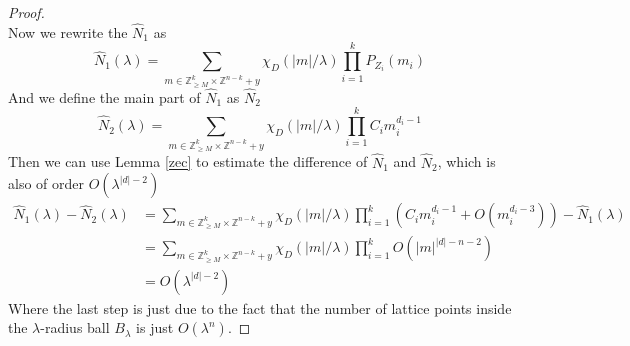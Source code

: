 \documentclass[10pt]{amsart}
\newcommand{\1}{\mathbb{1}}
\newcommand{\Z}{{\mathbb Z}}
\begin{document}
\begin{proof}
\[    \]
    Now we rewrite the $\hat{N}_1$ as
    \[
    \hat{N}_1(\lambda) = \sum_{m \in \Z_{\geq M}^k \times \Z^{n-k} + y} \chi_D(|m|/\lambda) \prod_{i=1}^k P_{Z_i}(m_i)
    \]
    And we define the main part of $\hat{N}_1$ as $\hat{N}_2$
    \[
    \hat{N}_2(\lambda) = \sum_{m \in \Z_{\geq M}^k \times \Z^{n-k} + y} \chi_D(|m|/\lambda) \prod_{i=1}^k C_im_i^{d_i-1}
    \]
    Then we can use Lemma \ref{zec} to estimate the difference of $\hat{N}_1$ and $\hat{N}_2$, which is also of order $O(\lambda^{|d|-2})$
    \begin{align*}
    \hat{N}_1(\lambda)-\hat{N}_2(\lambda) &= \sum_{m \in \Z_{\geq M}^k \times \Z^{n-k} + y} \chi_D(|m|/\lambda) \prod_{i=1}^k \left( C_i m_i^{d_i-1} + O(m_i^{d_i-3})\right)- \hat{N}_1(\lambda)\\
    &= \sum_{m \in \Z_{\geq M}^k \times \Z^{n-k} + y} \chi_D(|m|/\lambda) \prod_{i=1}^k O(|m|^{|d|-n-2})\\
    &= O(\lambda^{|d|-2})
    \end{align*}
    Where the last step is just due to the fact that the number of lattice points inside the $\lambda$-radius ball $B_{\lambda}$ is just $O(\lambda^n)$.


\end{proof}
\end{document}
